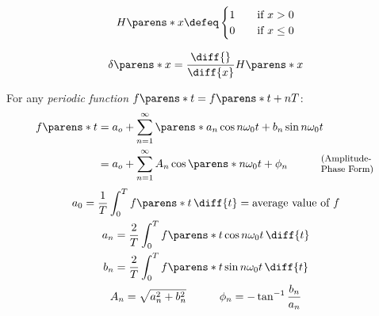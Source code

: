 \begin{multicols}{2}

    \begin{CheatsheetEntryFrame}

        \begin{gather*}
            H\parens*{x}
            \defeq
                \begin{cases}
                    1 &\quad \text{if } x > 0 \\
                    0 &\quad \text{if } x \le 0
                \end{cases}
        \end{gather*}

        \begin{gather*}
            \delta\parens*{x}
            = \frac{\diff{}}{\diff{x}} H\parens*{x}
        \end{gather*}

    \end{CheatsheetEntryFrame}

    \begin{CheatsheetEntryFrame}


        For any \emph{periodic function} $f \parens*{t} = f \parens*{t + n T}$:
        \begin{align*}
            f \parens*{t}
            &= a_o
            + \sum_{n=1}^\infty \parens*{
                a_n \cos n \omega_0 t + b_n \sin n \omega_0 t
            }
            \\
            &= a_o
            + \sum_{n=1}^\infty {
                A_n \cos \parens*{n \omega_0 t + \phi_n}
            }
            \qquad\quad \text{\parbox{5em}{\footnotesize{}(Amplitude-Phase Form)}}
        \end{align*}
        \begin{gather*}
            a_0
            = \frac{1}{T} \int_0^T f\parens*{t} \,\diff{t} = \text{average value of $f$}
            \\
            a_n
            = \frac{2}{T} \int_0^T f\parens*{t} \cos n \omega_0 t \,\diff{t}
            \\
            b_n
            = \frac{2}{T} \int_0^T f\parens*{t} \sin n \omega_0 t \,\diff{t}
            \\
            A_n = \sqrt{a_n^2 + b_n^2}
            \qquad\quad
            \phi_n = - \tan^{-1} \frac{b_n}{a_n}
        \end{gather*}


\end{CheatsheetEntryFrame}
\end{multicols}
